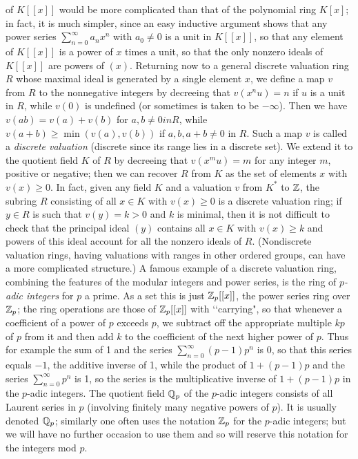 \documentclass[10pt]{article}
\begin{document}
of $K[[x]]$ would be more complicated than that of the polynomial ring
$K[x]$; in fact, it is much simpler, since an easy inductive argument
shows that any power series $\sum_{n=0}^\infty a_n x^n$ with $a_0\ne0$
is a unit in $K[[x]]$, so that any element of $K[[x]]$ is a power of $x$
times a unit, so that the only nonzero ideals of $K[[x]]$ are powers of
$(x)$. Returning now to a general discrete valuation ring $R$ whose
maximal ideal is generated by a single element $x$, we define a map $v$
from $R$ to the nonnegative integers by decreeing that $v(x^n u) = n$ if
$u$ is a unit in $R$, while $v(0)$ is undefined (or sometimes is taken
to be $-\infty$). Then we have $v(ab) = v(a) + v(b)$ for $a,b\ne0 in R$,
while $v(a+b)\ge\min(v(a),v(b))$ if $a,b,a+b\ne0$ in $R$. Such a map $v$
is called a {\sl discrete valuation} (discrete since its range lies in a
discrete set). We extend it to the quotient field $K$ of $R$ by
decreeing that $v(x^m u) = m$ for any integer $m$, positive or negative;
then we can recover $R$ from $K$ as the set of elements $x$ with
$v(x)\ge0$. In fact, given any field $K$ and a valuation $v$ from $K^*$
to $\Bbb Z$, the subring $R$ consisting of all $x\in K$ with $v(x)\ge0$
is a discrete valuation ring; if $y\in R$ is such that $v(y)=k>0$ and
$k$ is minimal, then it is not difficult to check that the principal
ideal $(y)$ contains all $x\in K$ with $v(x)\ge k$ and powers of this
ideal account for all the nonzero ideals of $R$. (Nondiscrete valuation
rings, having valuations with ranges in other ordered groups, can have a
more complicated structure.) A famous example of a discrete valuation
ring, combining the features of the modular integers and power series,
is the ring of {\sl $p$-adic integers} for $p$ a prime. As a set this is
just $\Bbb Z_p[[x]]$, the power series ring over $\Bbb Z_p$; the ring
operations are those of $\Bbb Z_p[[x]]$ with \lq\lq carrying", so that
whenever a coefficient of a power of $p$ exceeds $p$, we subtract off
the appropriate multiple $kp$ of $p$ from it and then add $k$ to the
coefficient of the next higher power of $p$. Thus for example the sum of
1 and the series $\sum_{n=0}^\infty (p-1)p^n$ is 0, so that this series
equals $-1$, the additive inverse of 1, while the product of $1+(p-1)p$
and the series $\sum_{n=0}^\infty p^n$ is 1, so the series is the
  multiplicative inverse of $1+(p-1)p$ in the $p$-adic integers. The
  quotient field $\Bbb Q_p$ of the $p$-adic integers consists of all
  Laurent series in $p$ (involving finitely many negative powers of
  $p$). It is usually denoted $\Bbb Q_p$; similarly one often uses the
  notation $\Bbb Z_p$ for the $p$-adic integers; but we will have no
  further occasion to use them and so will reserve this notation for the
  integers mod $p$.
\end{document}
